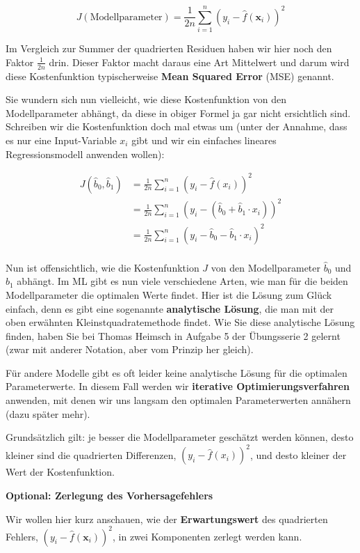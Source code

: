 \documentclass[
]{book}
\begin{document}
\[
J(\text{Modellparameter}) = \frac{1}{2n} \sum_{i=1}^{n} \left(y_i - \hat{f}(\mathbf{x}_i) \right)^2
\]

Im Vergleich zur Summer der quadrierten Residuen haben wir hier noch den Faktor \(\frac{1}{2n}\) drin. Dieser Faktor macht daraus eine Art Mittelwert und darum wird diese Kostenfunktion typischerweise \textbf{Mean Squared Error} (MSE) genannt.

Sie wundern sich nun vielleicht, wie diese Kostenfunktion von den Modellparameter abhängt, da diese in obiger Formel ja gar nicht ersichtlich sind. Schreiben wir die Kostenfunktion doch mal etwas um (unter der Annahme, dass es nur eine Input-Variable \(x_i\) gibt und wir ein einfaches lineares Regressionsmodell anwenden wollen):

\begin{align}
J(\hat{b}_0, \hat{b}_1) &= \frac{1}{2n} \sum_{i=1}^{n} \left(y_i - \hat{f}(x_i) \right)^2 \\
&= \frac{1}{2n} \sum_{i=1}^{n} \left(y_i - (\hat{b}_0 + \hat{b}_1 \cdot x_i) \right)^2 \\
&= \frac{1}{2n} \sum_{i=1}^{n} \left(y_i - \hat{b}_0 - \hat{b}_1 \cdot x_i \right)^2 \\
\end{align}

Nun ist offensichtlich, wie die Kostenfunktion \(J\) von den Modellparameter \(\hat{b}_0\) und \(\hat{b}_1\) abhängt. Im ML gibt es nun viele verschiedene Arten, wie man für die beiden Modellparameter die optimalen Werte findet. Hier ist die Lösung zum Glück einfach, denn es gibt eine sogenannte \textbf{analytische Lösung}, die man mit der oben erwähnten Kleinstquadratemethode findet. Wie Sie diese analytische Lösung finden, haben Sie bei Thomas Heimsch in Aufgabe 5 der Übungsserie 2 gelernt (zwar mit anderer Notation, aber vom Prinzip her gleich).

Für andere Modelle gibt es oft leider keine analytische Lösung für die optimalen Parameterwerte. In diesem Fall werden wir \textbf{iterative Optimierungsverfahren} anwenden, mit denen wir uns langsam den optimalen Parameterwerten annähern (dazu später mehr).

Grundsätzlich gilt: je besser die Modellparameter geschätzt werden können, desto kleiner sind die quadrierten Differenzen, \(\left(y_i - \hat{f}(x_i) \right)^2\), und desto kleiner der Wert der Kostenfunktion.

\textbf{Optional: Zerlegung des Vorhersagefehlers}

Wir wollen hier kurz anschauen, wie der \textbf{Erwartungswert} des quadrierten Fehlers, \(\left(y_i - \hat{f}(\mathbf{x}_i)\right)^2\), in zwei Komponenten zerlegt werden kann.
\end{document}
